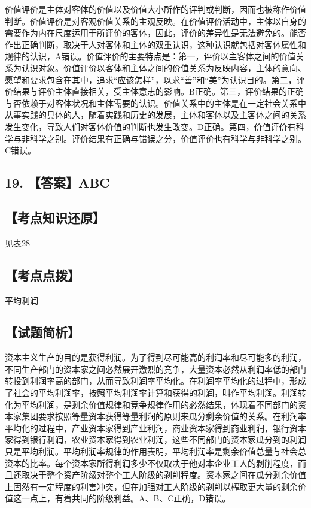 \documentclass[UTF8,11pt]{ctexart}
\begin{document}
价值评价是主体对客体的价值以及价值大小所作的评判或判断，因而也被称作价值判断。价值评价是对客观价值关系的主观反映。在价值评价活动中，主体以自身的需要作为内在尺度运用于所评价的客体，因此，评价的差异性是无法避免的。能否作出正确判断，取决于人对客体和主体的双重认识，这种认识就包括对客体属性和规律的认识，A错误。价值评价的主要特点是：第一，评价以主客体之间的价值关系为认识对象。价值评价以客体和主体之间的价值关系为反映内容，主体的意向、愿望和要求包含在其中，追求“应该怎样”，以求“善”和“美”为认识目的。第二，评价结果与评价主体直接相关，受主体意志的影响。B正确。第三，评价结果的正确与否依赖于对客体状况和主体需要的认识。价值关系中的主体是在一定社会关系中从事实践的具体的人，随着实践和历史的发展，主体和客体以及主客体之间的关系发生变化，导致人们对客体价值的判断也发生改变。D正确。第四，价值评价有科学与非科学之别。评价结果有正确与错误之分，价值评价也有科学与非科学之别。C错误。


\subsection*{19. 【答案】ABC}

\subsection*{【考点知识还原】}

见表28


\subsection*{【考点点拨】}

平均利润


\subsection*{【试题简析】}

资本主义生产的目的是获得利润。为了得到尽可能高的利润率和尽可能多的利润，不同生产部门的资本家之间必然展开激烈的竞争，大量资本必然从利润率低的部门转投到利润率高的部门，从而导致利润率平均化。在利润率平均化的过程中，形成了社会的平均利润率，按照平均利润率计算和获得的利润，叫作平均利润。利润转化为平均利润，是剩余价值规律和竞争规律作用的必然结果，体现着不同部门的资本家集团要求按照等量资本获得等量利润的原则来瓜分剩余价值的关系。在利润率平均化的过程中，产业资本家得到产业利润，商业资本家得到商业利润，银行资本家得到银行利润，农业资本家得到农业利润，这些不同部门的资本家瓜分到的利润只是平均利润。平均利润率规律的作用表明，平均利润率是剩余价值总量与社会总资本的比率。每个资本家所得利润多少不仅取决于他对本企业工人的剥削程度，而且还取决于整个资产阶级对整个工人阶级的剥削程度。资本家之间在瓜分剩余价值上固然有一定程度的利害冲突，但在加强对工人阶级的剥削以榨取更大量的剩余价值这一点上，有着共同的阶级利益。A、B、C正确，D错误。
\end{document}
